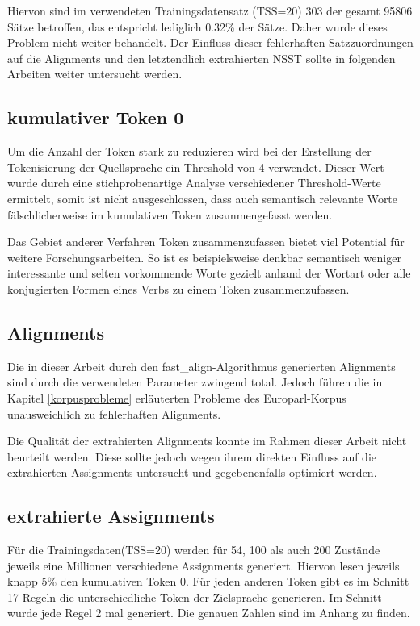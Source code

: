 \documentclass[conference]{IEEEtran}
\begin{document}
Hiervon sind im verwendeten Trainingsdatensatz (TSS=20) 303 der gesamt 95806 Sätze betroffen, das entspricht lediglich 0.32\% der Sätze. 
Daher wurde dieses Problem nicht weiter behandelt. 
Der Einfluss dieser fehlerhaften Satzzuordnungen auf die Alignments und den letztendlich extrahierten NSST sollte in folgenden Arbeiten weiter untersucht werden.

\subsection{kumulativer Token 0}
Um die Anzahl der Token stark zu reduzieren wird bei der Erstellung der Tokenisierung der Quellsprache ein Threshold von 4 verwendet.
Dieser Wert wurde durch eine stichprobenartige Analyse verschiedener Threshold-Werte ermittelt, somit ist nicht ausgeschlossen, dass auch semantisch relevante Worte fälschlicherweise im kumulativen Token zusammengefasst werden.

Das Gebiet anderer Verfahren Token zusammenzufassen bietet viel Potential für weitere Forschungsarbeiten. 
So ist es beispielsweise denkbar semantisch weniger interessante und selten vorkommende Worte gezielt anhand der Wortart oder alle konjugierten Formen eines Verbs zu einem Token zusammenzufassen.

\subsection{Alignments}
Die in dieser Arbeit durch den fast\_align-Algorithmus generierten Alignments sind durch die verwendeten Parameter zwingend total.
Jedoch führen die in Kapitel \ref{korpusprobleme} erläuterten Probleme des Europarl-Korpus unausweichlich zu fehlerhaften Alignments.

Die Qualität der extrahierten Alignments konnte im Rahmen dieser Arbeit nicht beurteilt werden.
Diese sollte jedoch wegen ihrem direkten Einfluss auf die extrahierten Assignments untersucht und gegebenenfalls optimiert werden. 

\subsection{extrahierte Assignments}
Für die Trainingsdaten(TSS=20) werden für 54, 100 als auch 200 Zustände jeweils eine Millionen verschiedene Assignments generiert. 
Hiervon lesen jeweils knapp 5\% den kumulativen Token 0.
Für jeden anderen Token gibt es im Schnitt 17 Regeln die unterschiedliche Token der Zielsprache generieren.
Im Schnitt wurde jede Regel 2 mal generiert.
Die genauen Zahlen sind im Anhang zu finden.
\end{document}
